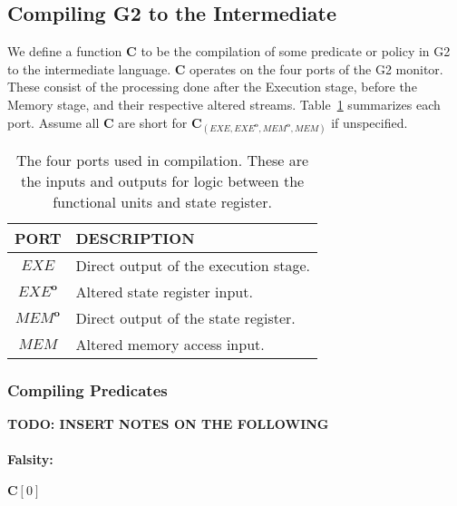 \documentclass[sigconf,usenames,dvipsnames,svgnames,table]{acmart}
\newcommand{\shdtt}[1]{\sethlcolor{MyLightGrey}\texttt{\hl{#1}}}
\newcommand{\obf}[1]{#1^\mathbf{o}}
\def \sysname {\textsc{G2}\xspace}
\begin{document}
    \subsection{Compiling \sysname to the Intermediate}\label{sec:comp:comp}
      We define a function $\mathbf{C}$ to be the compilation of some predicate or policy in \sysname to the intermediate language.
      $\mathbf{C}$ operates on the four ports of the \sysname monitor.
      These consist of the processing done after the Execution stage, before the Memory stage, and their respective altered streams.
      Table~\ref{tab:comp:comp:ports} summarizes each port.
      Assume all $\mathbf{C}$ are short for $\mathbf{C}_{(EXE,\obf{EXE},\obf{MEM},MEM)}$ if unspecified.
      \begin{table}
        \centering
        \begin{tabular}{c | l}
          PORT        & DESCRIPTION \\ \hline
          $EXE$       & Direct output of the execution stage. \\
          $\obf{EXE}$ & Altered state register input. \\
          $\obf{MEM}$ & Direct output of the state register. \\
          $MEM$       & Altered memory access input. 
        \end{tabular}
        \caption{
          The four ports used in compilation.
          These are the inputs and outputs for logic between the functional units and state register.
        }
        \label{tab:comp:comp:ports}
      \end{table}

      \subsubsection{Compiling Predicates}\label{sec:comp:comp:pred}

        \textbf{TODO: INSERT NOTES ON THE FOLLOWING}

        \paragraph{Falsity:}
          $\mathbf{C}[0]$ \par
\end{document}
